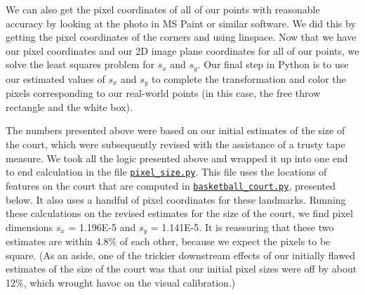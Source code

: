 \documentclass{article}
\begin{document}
We can also get the pixel coordinates of all of our points with reasonable accuracy by looking at the photo in MS Paint or similar software. 
We did this by getting the pixel coordinates of the corners and using linspace. 
Now that we have our pixel coordinates and our 2D image plane coordinates for all of our points, we solve the least squares problem for $s_x$ and $s_y$. 
Our final step in Python is to use our estimated values of $s_x$ and $s_y$ to complete the transformation and color the pixels corresponding to our real-world points 
(in this case, the free throw rectangle and the white box).

The numbers presented above were based on our initial estimates of the size of the court, 
which were subsequently revised with the assistance of a trusty tape measure.
We took all the logic presented above and wrapped it up into one end to end calculation
in the file 
\href{https://github.com/Harvard-AM-205-Basketball/Basketball/blob/master/src/pixel_size.py}
{\texttt{pixel\_size.py}}.  
This file uses the locations of features on the court that are computed in 
\href{https://github.com/Harvard-AM-205-Basketball/Basketball/blob/master/src/basketball_court.py}
{\texttt{basketball\_court.py}}, presented below.  
It also uses a handful of pixel coordinates for these landmarks.
Running these calculations on the revised estimates for the size of the court,
we find pixel dimensions $s_x$ = 1.196E-5 and $s_y$ = 1.141E-5.
It is reassuring that these two estimates are within 4.8\% of each other, because we expect the pixels to be square.
(As an aside, one of the trickier downstream effects of our initially flawed estimates of the size of the court
was that our initial pixel sizes were off by about 12\%, which wrought havoc on the visual calibration.)
\end{document}
